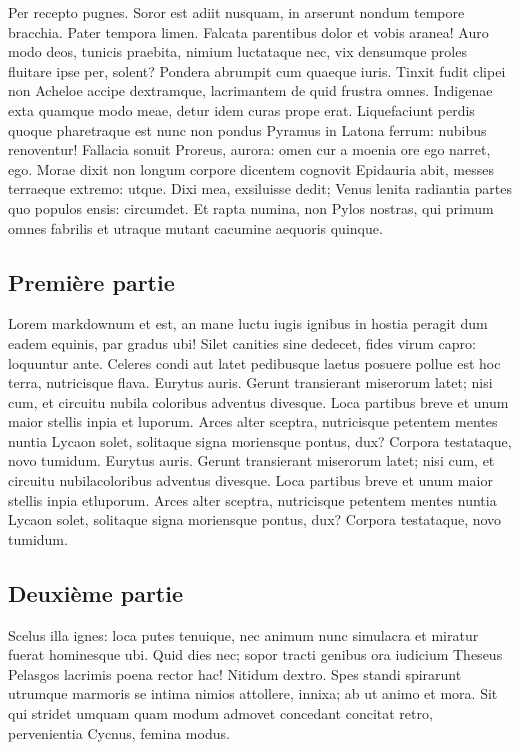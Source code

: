 \documentclass[9pt,twocolumn,twoside,]{pnas-new}
\begin{document}
Per recepto pugnes. Soror est adiit nusquam, in arserunt nondum tempore
bracchia. Pater tempora limen. Falcata parentibus dolor et vobis aranea!
Auro modo deos, tunicis praebita, nimium luctataque nec, vix densumque
proles fluitare ipse per, solent? Pondera abrumpit cum quaeque iuris.
Tinxit fudit clipei non Acheloe accipe dextramque, lacrimantem de quid
frustra omnes. Indigenae exta quamque modo meae, detur idem curas prope
erat. Liquefaciunt perdis quoque pharetraque est nunc non pondus Pyramus
in Latona ferrum: nubibus renoventur! Fallacia sonuit Proreus, aurora:
omen cur a moenia ore ego narret, ego. Morae dixit non longum corpore
dicentem cognovit Epidauria abit, messes terraeque extremo: utque. Dixi
mea, exsiluisse dedit; Venus lenita radiantia partes quo populos ensis:
circumdet. Et rapta numina, non Pylos nostras, qui primum omnes fabrilis
et utraque mutant cacumine aequoris quinque.

\hypertarget{premiuxe8re-partie}{%
\subsection{Première partie}\label{premiuxe8re-partie}}

Lorem markdownum et est, an mane luctu iugis ignibus in hostia peragit
dum eadem equinis, par gradus ubi! Silet canities sine dedecet, fides
virum capro: loquuntur ante. Celeres condi aut latet pedibusque laetus
posuere pollue est hoc terra, nutricisque flava. Eurytus auris. Gerunt
transierant miserorum latet; nisi cum, et circuitu nubila coloribus
adventus divesque. Loca partibus breve et unum maior stellis inpia et
luporum. Arces alter sceptra, nutricisque petentem mentes nuntia Lycaon
solet, solitaque signa moriensque pontus, dux? Corpora testataque, novo
tumidum. Eurytus auris. Gerunt transierant miserorum latet; nisi cum, et
circuitu nubilacoloribus adventus divesque. Loca partibus breve et unum
maior stellis inpia etluporum. Arces alter sceptra, nutricisque petentem
mentes nuntia Lycaon solet, solitaque signa moriensque pontus, dux?
Corpora testataque, novo tumidum.

\hypertarget{deuxiuxe8me-partie}{%
\subsection{Deuxième partie}\label{deuxiuxe8me-partie}}

Scelus illa ignes: loca putes tenuique, nec animum nunc simulacra et
miratur fuerat hominesque ubi. Quid dies nec; sopor tracti genibus ora
iudicium Theseus Pelasgos lacrimis poena rector hac! Nitidum dextro.
Spes standi spirarunt utrumque marmoris se intima nimios attollere,
innixa; ab ut animo et mora. Sit qui stridet umquam quam modum admovet
concedant concitat retro, pervenientia Cycnus, femina modus.
\end{document}
